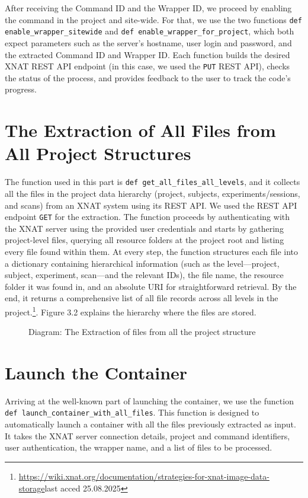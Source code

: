 After receiving the Command ID and the Wrapper ID, we proceed by enabling the command in the project and site-wide. For that, we use the two functions \texttt{def enable\_wrapper\_sitewide} and \texttt{def enable\_wrapper\_for\_project}, which both expect parameters such as the server’s hostname, user login and password, and the extracted Command ID and Wrapper ID. Each function builds the desired XNAT REST API endpoint (in this case, we used the \texttt{PUT} REST API), checks the status of the process, and provides feedback to the user to track the code’s progress.

\section{The Extraction of All Files from All Project Structures}

The function used in this part is \texttt{def get\_all\_files\_all\_levels}, and it collects all the files in the project data hierarchy (project, subjects, experiments/sessions, and scans) from an XNAT system using its REST API. We used the REST API endpoint \texttt{GET} for the extraction. The function proceeds by authenticating with the XNAT server using the provided user credentials and starts by gathering project-level files, querying all resource folders at the project root and listing every file found within them. At every step, the function structures each file into a dictionary containing hierarchical information (such as the level—project, subject, experiment, scan—and the relevant IDs), the file name, the resource folder it was found in, and an absolute URI for straightforward retrieval. By the end, it returns a comprehensive list of all file records across all levels in the project.\footnote{\url{https://wiki.xnat.org/documentation/strategies-for-xnat-image-data-storage}last acced 25.08.2025}. Figure 3.2 explains the hierarchy where the files are stored.

\begin{figure}[ht]
    \centering
    \def\svgwidth{0.9\linewidth}
    
    \caption{Diagram: The Extraction of files from all the project structure}
    \label{fig:enter-label}
\end{figure}

\section{Launch the Container}

Arriving at the well-known part of launching the container, we use the function \texttt{def launch\_container\_with\_all\_files}. This function is designed to automatically launch a container with all the files previously extracted as input. It takes the XNAT server connection details, project and command identifiers, user authentication, the wrapper name, and a list of files to be processed.

